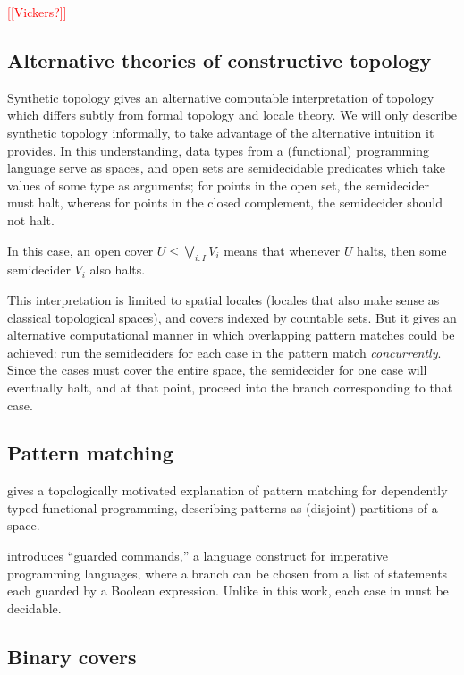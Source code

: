 \documentclass[conference]{IEEEtran}
\newcommand{\note}[1]{\textcolor{red}{[[{#1}]]}}
\begin{document}
\note{Vickers?}

\subsection{Alternative theories of constructive topology}

Synthetic topology gives an alternative computable interpretation of topology which differs subtly from formal topology and locale theory\cite{escardo2004, lesnik}. We will only describe synthetic topology informally, to take advantage of the alternative intuition it provides. In this understanding, data types from a (functional) programming language serve as spaces, and open sets are semidecidable predicates which take values of some type as arguments; for points in the open set, the semidecider must halt, whereas for points in the closed complement, the semidecider should not halt.

In this case, an open cover $U \le \bigvee_{i : I} V_i$ means that whenever $U$ halts, then some semidecider $V_i$ also halts.

This interpretation is limited to spatial locales (locales that also make sense as classical topological spaces), and covers indexed by countable sets. But it gives an alternative computational manner in which overlapping pattern matches could be achieved: run the semideciders for each case in the pattern match \emph{concurrently}. Since the cases must cover the entire space, the semidecider for one case will eventually halt, and at that point, proceed into the branch corresponding to that case.

\subsection{Pattern matching}

\cite{coquand1992} gives a topologically motivated explanation of pattern matching for dependently typed functional programming, describing patterns as (disjoint) partitions of a space.

\cite{dijkstra} introduces ``guarded commands,'' a language construct for imperative programming languages, where a branch can be chosen from a list of statements each guarded by a Boolean expression. Unlike in this work, each case in \cite{dijkstra} must be decidable.

\subsection{Binary covers}
\end{document}

